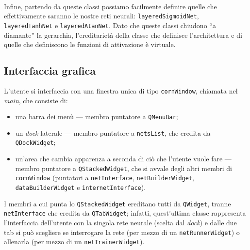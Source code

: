 \documentclass{article}
\begin{document}
\paragraph{} Infine, partendo da queste classi possiamo facilmente definire quelle che effettivamente saranno le nostre reti neurali: \texttt{layeredSigmoidNet}, \texttt{layeredTanhNet} e \texttt{layeredAtanNet}. Dato che queste classi chiudono “a diamante” la gerarchia, l'ereditarietà della classe che definisce l'architettura e di quelle che definiscono le funzioni di attivazione è virtuale.

\subsection{Interfaccia grafica}

L'utente si interfaccia con una finestra unica di tipo \texttt{cornWindow}, chiamata nel \emph{main}, che consiste di:
\begin{itemize}
 	\item una barra dei menù --- membro puntatore a \texttt{QMenuBar};
 	\item un \emph{dock} laterale --- membro puntatore a \texttt{netsList}, che eredita da \texttt{QDockWidget};
 	\item un'area che cambia apparenza a seconda di ciò che l'utente vuole fare --- membro puntatore a \texttt{QStackedWidget}, che si avvale degli altri membri di \texttt{cornWindow} (puntatori a \texttt{netInterface}, \texttt{netBuilderWidget}, \texttt{dataBuilderWidget} e \texttt{internetInterface}).
 \end{itemize}
I membri a cui punta lo \texttt{QStackedWidget} ereditano tutti da \texttt{QWidget}, tranne \texttt{netInterface} che eredita da \texttt{QTabWidget}; infatti, quest'ultima classe rappresenta l'interfaccia dell'utente con la singola rete neurale (scelta dal \emph{dock}) e dalle due tab si può scegliere se interrogare la rete (per mezzo di un \texttt{netRunnerWidget}) o allenarla (per mezzo di un \texttt{netTrainerWidget}).
\end{document}
